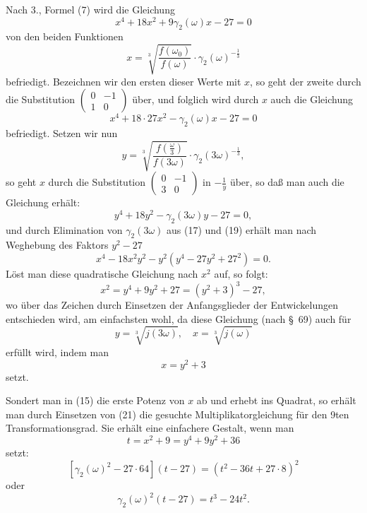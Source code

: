 \documentclass[12pt,a4paper]{article}
\theoremstyle{definition}
\begin{document}
Nach 3., Formel (7) wird die Gleichung
\begin{equation}\label{eq:72-15}
x^4 + 18x^2 + 9\gamma_2(\omega) x - 27 = 0
\end{equation}
von den beiden Funktionen
\[
x = \sqrt[3]{\frac{f(\omega_0)}{f(\omega)}} \cdot \gamma_2(\omega)^{-\frac{1}{3}}
\]
befriedigt. Bezeichnen wir den ersten dieser Werte mit $x$, so geht der zweite durch die Substitution $\begin{pmatrix} 0 & -1 \\ 1 & 0 \end{pmatrix}$ über, und folglich wird durch $x$ auch die Gleichung
\begin{equation}\label{eq:72-17}
x^4 + 18 \cdot 27 x^2 - \gamma_2(\omega) x - 27 = 0
\end{equation}
befriedigt. Setzen wir nun
\begin{equation}\label{eq:72-18}
y = \sqrt[3]{\frac{f(\frac{\omega}{3})}{f(3\omega)}} \cdot \gamma_2(3\omega)^{-\frac{1}{3}},
\end{equation}
so geht $x$ durch die Substitution $\begin{pmatrix} 0 & -1 \\ 3 & 0 \end{pmatrix}$ in $-\frac{1}{y}$ über, so daß man auch die Gleichung erhält:
\begin{equation}\label{eq:72-19}
y^4 + 18y^2 - \gamma_2(3\omega) y - 27 = 0,
\end{equation}
und durch Elimination von $\gamma_2(3\omega)$ aus (17) und (19) erhält man nach Weghebung des Faktors $y^2 - 27$
\begin{equation}\label{eq:72-20}
x^4 - 18x^2y^2 - y^2(y^4 - 27y^2 + 27^2) = 0.
\end{equation}
Löst man diese quadratische Gleichung nach $x^2$ auf, so folgt:
\begin{equation}\label{eq:72-21}
x^2 = y^4 + 9y^2 + 27 = (y^2 + 3)^3 - 27,
\end{equation}
wo über das Zeichen durch Einsetzen der Anfangsglieder der Entwickelungen entschieden wird, am einfachsten wohl, da diese Gleichung (nach \S\ 69) auch für
\[
y = \sqrt[3]{j(3\omega)}, \quad x = \sqrt[3]{j(\omega)}
\]
erfüllt wird, indem man
\[
x = y^2 + 3
\]
setzt.

Sondert man in (15) die erste Potenz von $x$ ab und erhebt ins Quadrat, so erhält man durch Einsetzen von (21) die gesuchte Multiplikatorgleichung für den 9ten Transformationsgrad. Sie erhält eine einfachere Gestalt, wenn man
\begin{equation}\label{eq:72-22}
t = x^2 + 9 = y^4 + 9y^2 + 36
\end{equation}
setzt:
\begin{equation}\label{eq:72-23}
[\gamma_2(\omega)^2 - 27 \cdot 64](t - 27) = (t^2 - 36t + 27 \cdot 8)^2
\end{equation}
oder
\begin{equation}\label{eq:72-24}
\gamma_2(\omega)^2 (t - 27) = t^3 - 24t^2.
\end{equation}
\end{document}
